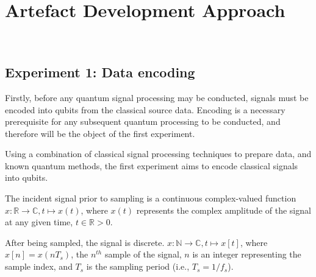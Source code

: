 \section{Artefact Development Approach}~\label{sec:approach}

\subsection{Experiment 1: Data encoding}
Firstly, before any quantum signal processing may be conducted, signals must be encoded into qubits from the classical source data.
Encoding is a necessary prerequisite for any subsequent quantum processing to be conducted, and therefore will be the object of the first experiment.

Using a combination of classical signal processing techniques to prepare data, and known quantum methods, the first experiment aims to encode classical signals into qubits.

The incident signal prior to sampling is a continuous complex-valued function
$x : \mathbb{R} \rightarrow \mathbb{C}, t \mapsto x(t)$,
where $x(t)$ represents the complex amplitude of the signal at any given time, $t \in \mathbb{R} > 0$.

After being sampled, the signal is discrete.
$x : \mathbb{N} \rightarrow \mathbb{C}, t \mapsto x[t]$,
where $x[n] = x(n T_s)$, the $n^{th}$ sample of the signal, $n$ is an integer representing the sample index, and $T_s$ is the sampling period (i.e., $T_s = 1/f_s$).


